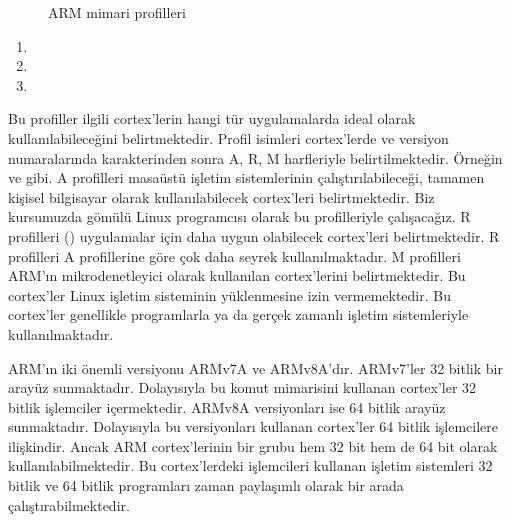 \documentclass[letterpaper,10pt,turkish]{sphinxmanual}
\begin{document}
\begin{figure}[htbp]
\centering
\capstart

\noindent{}
\caption{ARM mimari profilleri}\label{\detokenize{introduction:id4}}\end{figure}
\begin{enumerate}
%
\item {} 
\sphinxAtStartPar
{}

\item {} 
\sphinxAtStartPar
{}

\item {} 
\sphinxAtStartPar
{}

\end{enumerate}

\sphinxAtStartPar
Bu profiller ilgili cortex’lerin hangi tür uygulamalarda ideal olarak kullanılabileceğini
belirtmektedir. Profil isimleri cortex’lerde ve versiyon numaralarında \sphinxcode{\sphinxupquote{\sphinxhyphen{}}} karakterinden sonra
A, R, M harfleriyle belirtilmektedir. Örneğin  ve  gibi. A profilleri
masaüstü işletim sistemlerinin çalıştırılabileceği, tamamen kişisel bilgisayar olarak
kullanılabilecek cortex’leri belirtmektedir. Biz kursumuzda gömülü Linux programcısı olarak bu
 profilleriyle çalışacağız. R profilleri  () uygulamalar için daha
uygun olabilecek cortex’leri belirtmektedir. R profilleri A profillerine göre çok daha seyrek
kullanılmaktadır. M profilleri ARM’ın mikrodenetleyici olarak kullanılan cortex’lerini
belirtmektedir. Bu cortex’ler Linux işletim sisteminin yüklenmesine izin vermemektedir. Bu
cortex’ler genellikle  programlarla ya da gerçek zamanlı işletim sistemleriyle
kullanılmaktadır.

\sphinxAtStartPar
ARM’ın iki önemli versiyonu ARMv7\sphinxhyphen{}A ve ARMv8\sphinxhyphen{}A’dır. ARMv7’ler 32 bitlik bir arayüz sunmaktadır.
Dolayısıyla bu komut mimarisini kullanan cortex’ler 32 bitlik işlemciler içermektedir. ARMv8\sphinxhyphen{}A
versiyonları ise 64 bitlik arayüz sunmaktadır. Dolayısıyla bu versiyonları kullanan cortex’ler
64 bitlik işlemcilere ilişkindir. Ancak ARM cortex’lerinin bir grubu hem 32 bit hem de 64 bit
olarak kullanılabilmektedir. Bu cortex’lerdeki işlemcileri kullanan işletim sistemleri 32 bitlik
ve 64 bitlik programları zaman paylaşımlı olarak bir arada çalıştırabilmektedir.
\end{document}
